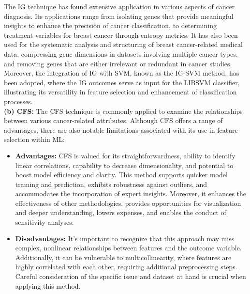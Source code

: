 \documentclass[a4paper,fleqn]{cas-sc}
\begin{document}
The \ac{IG} technique has found extensive application in various aspects of cancer diagnosis. Its applications range from isolating genes that provide meaningful insights to enhance the precision of cancer classification, to determining treatment variables for breast cancer through entropy metrics. It has also been used for the systematic analysis and structuring of breast cancer-related medical data, compressing gene dimensions in datasets involving multiple cancer types, and removing genes that are either irrelevant or redundant in cancer studies. Moreover, the integration of \ac{IG} with \ac{SVM}, known as the IG-SVM method, has been adopted, where the \ac{IG} outcomes serve as input for the LIBSVM classifier, illustrating its versatility in feature selection and enhancement of classification processes.\\

\noindent \textbf{(b)  \Acf{CFS}:}
The \ac{CFS} technique is commonly applied to examine the relationships between various cancer-related attributes. Although \ac{CFS} offers a range of advantages, there are also notable limitations associated with its use in feature selection within \ac{ML}:

\begin{itemize}
    \item \textbf{Advantages:}  \ac{CFS} is valued for its straightforwardness, ability to identify linear correlations, capability to decrease dimensionality, and potential to boost model efficiency and clarity. This method supports quicker model training and prediction, exhibits robustness against outliers, and accommodates the incorporation of expert insights. Moreover, it enhances the effectiveness of other methodologies, provides opportunities for visualization and deeper understanding, lowers expenses, and enables the conduct of sensitivity analyses.
    
    \item \textbf{Disadvantages:} It's important to recognize that this approach may miss complex, nonlinear relationships between features and the outcome variable. Additionally, it can be vulnerable to multicollinearity, where features are highly correlated with each other, requiring additional preprocessing steps. Careful consideration of the specific issue and dataset at hand is crucial when applying this method.
\end{itemize}
\end{document}
